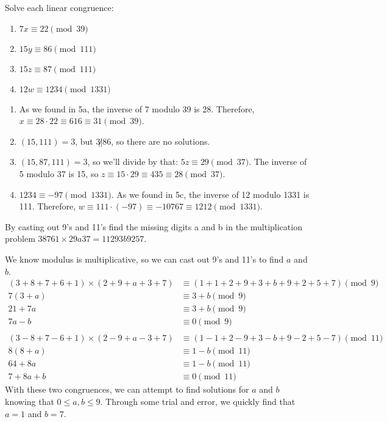 \documentclass{article}
\begin{document}
\begin{problem}{}{}
    Solve each linear congruence:
    \begin{enumerate}[label=\textbf{\alph*}.]
        \item $7x\equiv22\pmod{39}$
        \item $15y\equiv86\pmod{111}$
        \item $15z\equiv87\pmod{111}$
        \item $12w\equiv1234\pmod{1331}$
    \end{enumerate}
\end{problem}
\begin{solution}{}{}
    \begin{enumerate}[label=\textbf{\alph*}.]
        \item As we found in 5a, the inverse of 7 modulo 39 is 28. Therefore, $x\equiv28\cdot22\equiv616\equiv31\pmod{39}$. 
        \item $(15,111)=3$, but $3\not|86$, so there are no solutions.
        \item $(15,87,111)=3$, so we'll divide by that: $5z\equiv29\pmod{37}$. The inverse of 5 modulo 37 is 15, so $z\equiv15\cdot29\equiv435\equiv28\pmod{37}$.
        \item $1234\equiv -97 \pmod{1331}$. As we found in 5c, the inverse of 12 modulo 1331 is 111. Therefore, $w\equiv111\cdot(-97)\equiv-10767\equiv1212\pmod{1331}$.
    \end{enumerate}
\end{solution}

\begin{problem}{}{}
    By casting out 9's and 11's find the missing digits a and b in the multiplication problem $38761 \times 29a37 = 11293b9257$.
\end{problem}
\begin{solution}{}{}
    We know modulus is multiplicative, so we can cast out 9's and 11's to find $a$ and $b$.
    \begin{align*}
        (3+8+7+6+1)\times(2+9+a+3+7) &\equiv (1+1+2+9+3+b+9+2+5+7) \pmod{9}\\
        7(3+a) &\equiv 3+b \pmod{9}\\
        21+7a &\equiv 3+b \pmod{9}\\
        7a-b &\equiv 0 \pmod{9}\\\\
        (3-8+7-6+1)\times(2-9+a-3+7) &\equiv (1-1+2-9+3-b+9-2+5-7) \pmod{11}\\
        8(8+a) &\equiv 1-b \pmod{11}\\
        64+8a &\equiv 1-b \pmod{11}\\
        7+8a+b &\equiv 0 \pmod{11}
    \end{align*}
    With these two congruences, we can attempt to find solutions for $a$ and $b$ knowing that $0\leq a,b\leq9$. Through some trial and error, we quickly find that $a=1$ and $b=7$.
\end{solution}
\end{document}
